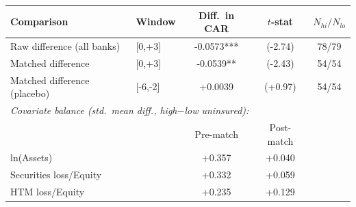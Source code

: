 \begin{tabular}{llccc}
\toprule
Comparison & Window & Diff.\ in CAR & $t$-stat & $N_{hi}/N_{lo}$ \\
\midrule
Raw difference (all banks) & [0,+3] & -0.0573*** & (-2.74) & 78/79 \\
Matched difference & [0,+3] & -0.0539** & (-2.43) & 54/54 \\
Matched difference (placebo) & [-6,-2] & +0.0039 & (+0.97) & 54/54 \\
\midrule
\multicolumn{5}{l}{\textit{Covariate balance (std.\ mean diff., high$-$low uninsured):}} \\
& & Pre-match & Post-match & \\
\quad ln(Assets) & & +0.357 & +0.040 & \\
\quad Securities loss/Equity & & +0.332 & +0.059 & \\
\quad HTM loss/Equity & & +0.235 & +0.129 & \\
\bottomrule
\end{tabular}